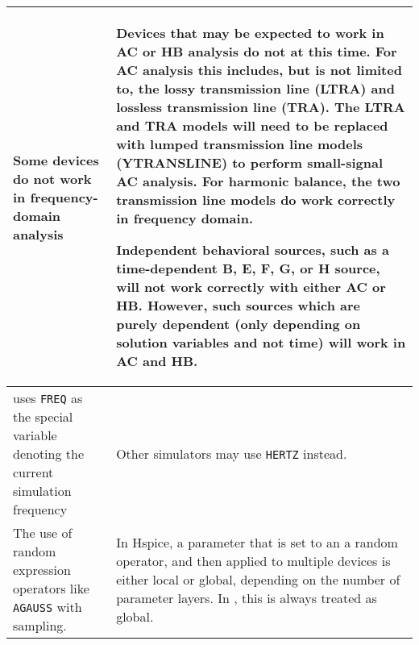 \begin{longtable}[h] {>{\raggedright\small}m{2in}|>{\raggedright\let\\\tabularnewline\small}m{3.5in}}
    Some devices do not work in frequency-domain analysis & Devices
    that may be expected to work in AC or HB analysis do not at this
    time.  For AC analysis this includes, but is not limited to, the
    lossy transmission line (LTRA) and lossless transmission line
    (TRA).  The LTRA and TRA models will need to be replaced with
    lumped transmission line models (YTRANSLINE) to perform
    small-signal AC analysis.  For harmonic balance, the two
    transmission line models do work correctly in frequency domain.

    Independent behavioral sources, such as a time-dependent B, E, F, G, or H 
    source, will not work correctly with either AC or HB. 
    However, such sources which are purely dependent (only depending on solution 
    variables and not time) will work in AC and HB.
    \\ \hline

    \Xyce{} uses \texttt{FREQ} as the special variable denoting the
    current simulation frequency  & Other simulators may use \texttt{HERTZ}
    instead. \\ \hline

    The use of random expression operators like \texttt{AGAUSS} with 
    sampling.
    &   In Hspice, a parameter that is set to an a random operator, 
    and then applied to multiple devices is either local or global, 
    depending on the number of parameter layers.  In \Xyce{}, this 
    is always treated as global.
    \\ \hline

\end{longtable}

